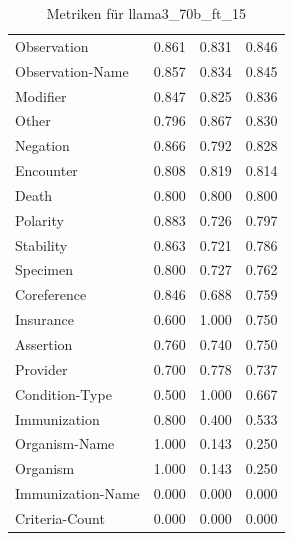\begin{table}[htbp]
\begin{tabular}{p{5cm}ccc}
Observation & 0.861 & 0.831 & 0.846 \\
Observation-Name & 0.857 & 0.834 & 0.845 \\
Modifier & 0.847 & 0.825 & 0.836 \\
Other & 0.796 & 0.867 & 0.830 \\
Negation & 0.866 & 0.792 & 0.828 \\
Encounter & 0.808 & 0.819 & 0.814 \\
Death & 0.800 & 0.800 & 0.800 \\
Polarity & 0.883 & 0.726 & 0.797 \\
Stability & 0.863 & 0.721 & 0.786 \\
Specimen & 0.800 & 0.727 & 0.762 \\
Coreference & 0.846 & 0.688 & 0.759 \\
Insurance & 0.600 & 1.000 & 0.750 \\
Assertion & 0.760 & 0.740 & 0.750 \\
Provider & 0.700 & 0.778 & 0.737 \\
Condition-Type & 0.500 & 1.000 & 0.667 \\
Immunization & 0.800 & 0.400 & 0.533 \\
Organism-Name & 1.000 & 0.143 & 0.250 \\
Organism & 1.000 & 0.143 & 0.250 \\
Immunization-Name & 0.000 & 0.000 & 0.000 \\
Criteria-Count & 0.000 & 0.000 & 0.000 \\
\bottomrule
\end{tabular}
\caption{Metriken für llama3_70b_ft_15}
\label{tab:metrics_llama3_70b_ft_15}
\end{table}